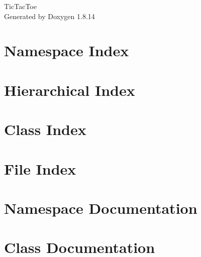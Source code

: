 \documentclass[twoside]{book}
\newcommand{\+}{\discretionary{\mbox{\scriptsize$\hookleftarrow$}}{}{}}
\newcommand{\clearemptydoublepage}{%
  \newpage{\pagestyle{empty}\cleardoublepage}%
}
\begin{document}
\hypersetup{pageanchor=false,
             bookmarksnumbered=true,
             pdfencoding=unicode
            }
\begin{titlepage}
\vspace*{7cm}
\begin{center}%
{\Large Tic\+Tac\+Toe }\\
\vspace*{1cm}
{\large Generated by Doxygen 1.8.14}\\
\end{center}
\end{titlepage}
\clearemptydoublepage
{}
\tableofcontents
\clearemptydoublepage
{}
\hypersetup{pageanchor=true}

\chapter{Namespace Index}

\chapter{Hierarchical Index}

\chapter{Class Index}

\chapter{File Index}

\chapter{Namespace Documentation}



\chapter{Class Documentation}















\end{document}
